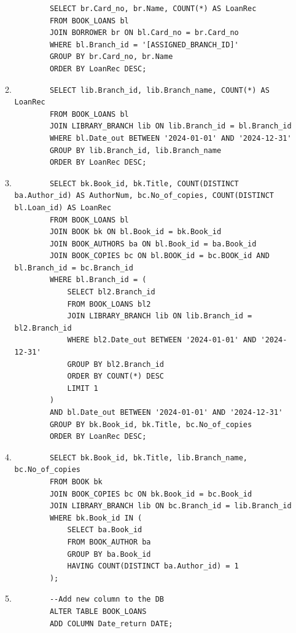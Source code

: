 \documentclass[12pt,a4paper]{article}
\begin{document}
\begin{enumerate}
\begin{enumerate}
\begin{verbatim}
        SELECT br.Card_no, br.Name, COUNT(*) AS LoanRec
        FROM BOOK_LOANS bl
        JOIN BORROWER br ON bl.Card_no = br.Card_no
        WHERE bl.Branch_id = '[ASSIGNED_BRANCH_ID]'
        GROUP BY br.Card_no, br.Name
        ORDER BY LoanRec DESC;
        \end{verbatim}
        \item
        \begin{verbatim}
        SELECT lib.Branch_id, lib.Branch_name, COUNT(*) AS LoanRec
        FROM BOOK_LOANS bl
        JOIN LIBRARY_BRANCH lib ON lib.Branch_id = bl.Branch_id
        WHERE bl.Date_out BETWEEN '2024-01-01' AND '2024-12-31'
        GROUP BY lib.Branch_id, lib.Branch_name
        ORDER BY LoanRec DESC;
        \end{verbatim}
        \item
        \begin{verbatim}
        SELECT bk.Book_id, bk.Title, COUNT(DISTINCT ba.Author_id) AS AuthorNum, bc.No_of_copies, COUNT(DISTINCT bl.Loan_id) AS LoanRec
        FROM BOOK_LOANS bl
        JOIN BOOK bk ON bl.Book_id = bk.Book_id
        JOIN BOOK_AUTHORS ba ON bl.Book_id = ba.Book_id
        JOIN BOOK_COPIES bc ON bl.BOOK_id = bc.BOOK_id AND bl.Branch_id = bc.Branch_id
        WHERE bl.Branch_id = (
            SELECT bl2.Branch_id
            FROM BOOK_LOANS bl2
            JOIN LIBRARY_BRANCH lib ON lib.Branch_id = bl2.Branch_id
            WHERE bl2.Date_out BETWEEN '2024-01-01' AND '2024-12-31'
            GROUP BY bl2.Branch_id
            ORDER BY COUNT(*) DESC
            LIMIT 1
        )
        AND bl.Date_out BETWEEN '2024-01-01' AND '2024-12-31'
        GROUP BY bk.Book_id, bk.Title, bc.No_of_copies
        ORDER BY LoanRec DESC;
        \end{verbatim}

        \item
        \begin{verbatim}
        SELECT bk.Book_id, bk.Title, lib.Branch_name, bc.No_of_copies
        FROM BOOK bk
        JOIN BOOK_COPIES bc ON bk.Book_id = bc.Book_id
        JOIN LIBRARY_BRANCH lib ON bc.Branch_id = lib.Branch_id
        WHERE bk.Book_id IN (
            SELECT ba.Book_id
            FROM BOOK_AUTHOR ba
            GROUP BY ba.Book_id
            HAVING COUNT(DISTINCT ba.Author_id) = 1
        );
        \end{verbatim}
        \item
        \begin{verbatim}
        --Add new column to the DB
        ALTER TABLE BOOK_LOANS
        ADD COLUMN Date_return DATE;


\end{verbatim}
\end{enumerate}
\end{enumerate}
\end{document}
